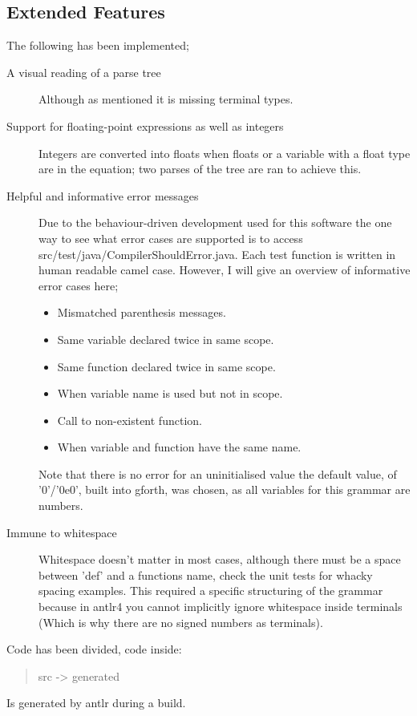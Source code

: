 \documentclass[a4paper,12pt]{article}
\begin{document}
\subsection{Extended Features}
The following has been implemented;
\begin{description}
    \item[A visual reading of a parse tree] \hfill
        Although as mentioned it is missing terminal types.
    \item[Support for floating-point expressions as well as integers] \hfill
        Integers are converted into floats when floats or a variable with a float type are in the equation; two parses of the tree are ran to achieve this.
    \item[Helpful and informative error messages]
        Due to the behaviour-driven development used for this software the one way to see what error cases are supported is to access src/test/java/CompilerShouldError.java. Each test function is written in human readable camel case. However, I will give an overview of informative error cases here;
        \begin{itemize}
            \item Mismatched parenthesis messages.
            \item Same variable declared twice in same scope.
            \item Same function declared twice in same scope.
            \item When variable name is used but not in scope.
            \item Call to non-existent function.
            \item When variable and function have the same name.
        \end{itemize}
        Note that there is no error for an uninitialised value the default value, of '0'/'0e0', built into gforth, was chosen, as all variables for this grammar are numbers.
    \item[Immune to whitespace]
       Whitespace doesn't matter in most cases, although there must be a space between 'def' and a functions name, check the unit tests for whacky spacing examples. This required a specific structuring of the grammar because in antlr4 you cannot implicitly ignore whitespace inside terminals (Which is why there are no signed numbers as terminals).
\end{description}

Code has been divided, code inside:
\begin{quotation}
src -> generated
\end{quotation}
Is generated by antlr during a build.
\end{document}
